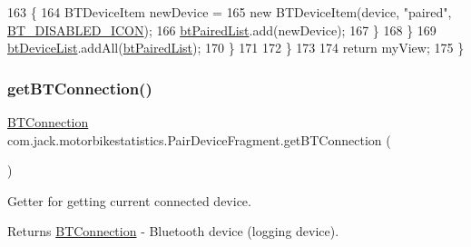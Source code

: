 \begin{DoxyCode}
163                     \{
164                         BTDeviceItem newDevice =
165                             \textcolor{keyword}{new} BTDeviceItem(device, \textcolor{stringliteral}{"paired"}, \hyperlink{classcom_1_1jack_1_1motorbikestatistics_1_1_pair_device_fragment_a27b366d93919d4f48ab58834ce40b117}{BT\_DISABLED\_ICON});
166                         \hyperlink{classcom_1_1jack_1_1motorbikestatistics_1_1_pair_device_fragment_aace08948a2a397e9f724cfbf12256cfa}{btPairedList}.add(newDevice);
167                     \}
168                 \}
169                 \hyperlink{classcom_1_1jack_1_1motorbikestatistics_1_1_pair_device_fragment_a422043a997fbe99ca9391440ce8b1180}{btDeviceList}.addAll(\hyperlink{classcom_1_1jack_1_1motorbikestatistics_1_1_pair_device_fragment_aace08948a2a397e9f724cfbf12256cfa}{btPairedList});
170             \}
171 
172         \}
173 
174         \textcolor{keywordflow}{return} myView;
175     \}
\end{DoxyCode}
\mbox{\label{classcom_1_1jack_1_1motorbikestatistics_1_1_pair_device_fragment_a32debe1358d94bb1c972137f60d1aa36}} 
\subsubsection{\texorpdfstring{get\+B\+T\+Connection()}{getBTConnection()}}
{\footnotesize\ttfamily \hyperlink{classcom_1_1jack_1_1motorbikestatistics_1_1_b_t_connection}{B\+T\+Connection} com.\+jack.\+motorbikestatistics.\+Pair\+Device\+Fragment.\+get\+B\+T\+Connection (\begin{DoxyParamCaption}{ }\end{DoxyParamCaption})\hspace{0.3cm}{\ttfamily [inline]}}



Getter for getting current connected device. 

\begin{DoxyReturn}{Returns}
\hyperlink{classcom_1_1jack_1_1motorbikestatistics_1_1_b_t_connection}{B\+T\+Connection} -\/ Bluetooth device (logging device). 
\end{DoxyReturn}


